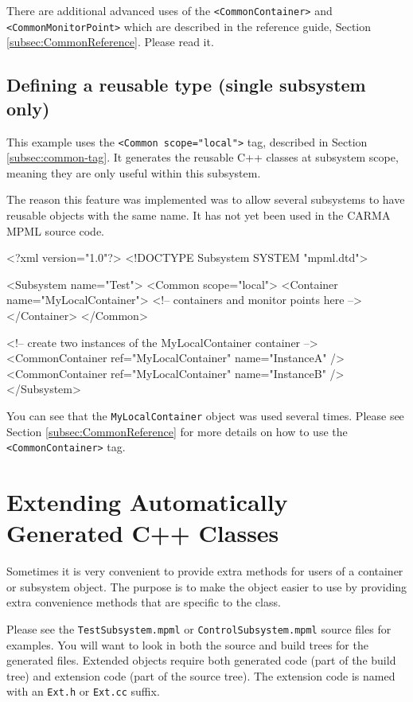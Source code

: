 \documentclass[letterpaper,12pt,oneside,pdftex]{article}
\newcommand{\shadebox}[1]{\fcolorbox{black}{shade}{\begin{minipage}{\textwidth}#1\end{minipage}}}
\newcommand{\mpml}[1]{\texttt{<#1>}}
\begin{document}
There are additional advanced uses of the \mpml{CommonContainer} and
\mpml{CommonMonitorPoint} which are described in the reference guide, Section
\ref{subsec:CommonReference}. Please read it.

\subsection{Defining a reusable type (single subsystem only)}

This example uses the \mpml{Common scope="local"} tag, described in Section
\ref{subsec:common-tag}. It generates the reusable C++ classes at subsystem
scope, meaning they are only useful within this subsystem.

The reason this feature was implemented was to allow several subsystems to have
reusable objects with the same name. It has not yet been used in the CARMA MPML
source code.

\begin{verbbox}
<?xml version="1.0"?>
<!DOCTYPE Subsystem SYSTEM "mpml.dtd">

<Subsystem name="Test">
    <Common scope="local">
        <Container name="MyLocalContainer">
            <!-- containers and monitor points here -->
        </Container>
    </Common>

    <!-- create two instances of the MyLocalContainer container -->
    <CommonContainer ref="MyLocalContainer" name="InstanceA" />
    <CommonContainer ref="MyLocalContainer" name="InstanceB" />
</Subsystem>
\end{verbbox}
\shadebox{\theverbbox}

You can see that the \texttt{MyLocalContainer} object was used several times.
Please see Section \ref{subsec:CommonReference} for more details on how to use
the \mpml{CommonContainer} tag.

\section{Extending Automatically Generated C++ Classes}
\label{sec:extensions}

Sometimes it is very convenient to provide extra methods for users of a
container or subsystem object. The purpose is to make the object easier to use
by providing extra convenience methods that are specific to the class.

Please see the \texttt{TestSubsystem.mpml} or \texttt{ControlSubsystem.mpml}
source files for examples. You will want to look in both the source and build
trees for the generated files. Extended objects require both generated code
(part of the build tree) and extension code (part of the source tree). The
extension code is named with an \texttt{Ext.h} or \texttt{Ext.cc} suffix.
\end{document}
